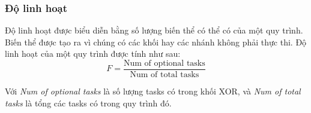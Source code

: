 \subsubsection{Độ linh hoạt}
Độ linh hoạt được biểu diễn bằng số lượng biến thể có thể có của một quy trình. Biến thể được tạo ra vì chúng có các khối hay các nhánh không phải thực thi. Độ linh hoạt của một quy trình được tính như sau:
\[F = \frac{\text{Num of optional tasks}}{\text{Num of total tasks}}\]
\par
Với \emph{Num of optional tasks} là số lượng tasks có trong khối XOR, và \emph{Num of total tasks} là tổng các tasks có trong quy trình đó.